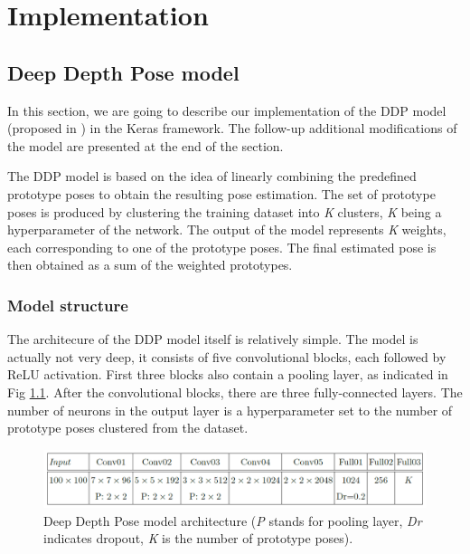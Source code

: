 \chapter{Implementation}\label{chap:implementation}


\section{Deep Depth Pose model}
In this section, we are going to describe our implementation of the DDP model (proposed in \cite{Marin18jvcir}) in the Keras framework. The follow-up additional modifications of the model are presented at the end of the section.\par
\vspace{5mm}
\noindent
The DDP model is based on the idea of linearly combining the predefined prototype poses to obtain the resulting pose estimation. The set of prototype poses is produced by clustering the training dataset into \textit{K} clusters, \textit{K} being a hyperparameter of the network. The output of the model represents \textit{K} weights, each corresponding to one of the prototype poses. The final estimated pose is then obtained as a sum of the weighted prototypes.


\subsection{Model structure}

The architecure of the DDP model itself is relatively simple. The model is actually not very deep, it consists of five convolutional blocks, each followed by ReLU activation. First three blocks also contain a pooling layer, as indicated in Fig \ref{fig:ddp}. After the convolutional blocks, there are three fully-connected layers. The number of neurons in the output layer is a hyperparameter set to the number of prototype poses clustered from the dataset. \par

\vspace{5mm}
\begin{figure}[H]
\begin{center}
  \includegraphics[width=\textwidth]{images/implementation/ddp.PNG}
  \caption[Deep Depth Pose model architecture \cite{Marin18jvcir}.]{Deep Depth Pose model architecture \cite{Marin18jvcir} (\textit{P} stands for pooling layer, \textit{Dr} indicates dropout, \textit{K} is the number of prototype poses).}
  \label{fig:ddp}
\end{center}
\end{figure}


